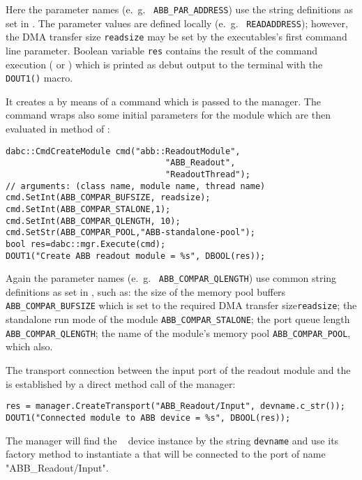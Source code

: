 \begin{compactenum}
Here the parameter names (e.~g.~ {\tt ABB\_PAR\_ADDRESS}) use
the string definitions as set in . The
parameter values are defined locally (e.~g.~ {\tt READADDRESS});
however, the DMA transfer size {\tt readsize} may be set by
the executables's first command line parameter. 
Boolean variable {\tt res} contains the result 
of the command execution ( or ) which is
printed as debut output to the terminal with the {\tt DOUT1()} macro. 

\item It creates a  by means of a command
 which is passed to the manager. The 
command wraps also some initial
parameters for the module which are then evaluated in 
method  of :

\begin{small}
\begin{verbatim}
dabc::CmdCreateModule cmd("abb::ReadoutModule",
                                "ABB_Readout", 
                                "ReadoutThread");
// arguments: (class name, module name, thread name)
cmd.SetInt(ABB_COMPAR_BUFSIZE, readsize);
cmd.SetInt(ABB_COMPAR_STALONE,1);
cmd.SetInt(ABB_COMPAR_QLENGTH, 10);
cmd.SetStr(ABB_COMPAR_POOL,"ABB-standalone-pool");
bool res=dabc::mgr.Execute(cmd);
DOUT1("Create ABB readout module = %s", DBOOL(res));
\end{verbatim}
\end{small}

Again the parameter names (e.~g.~ {\tt ABB\_COMPAR\_QLENGTH}) use
common string definitions as set in , 
such as: 
the size of the memory pool buffers {\tt ABB\_COMPAR\_BUFSIZE} which is
set to the required DMA transfer size{\tt readsize};
the standalone run mode of the module {\tt ABB\_COMPAR\_STALONE};
the port queue length {\tt ABB\_COMPAR\_QLENGTH}; the name of
the module's memory pool {\tt ABB\_COMPAR\_POOL}, which also. 

\item The transport connection between the input port of the readout module and
the  is established by a direct method call of the manager:
\begin{small}
\begin{verbatim}
res = manager.CreateTransport("ABB_Readout/Input", devname.c_str());
DOUT1("Connected module to ABB device = %s", DBOOL(res));
\end{verbatim}  
\end{small}
The manager will find the \ABB~ device instance by the string {\tt devname}
and use its factory method  to instantiate a
 that will be connected to the port of name
"ABB\_Readout/Input".


\end{compactenum}
